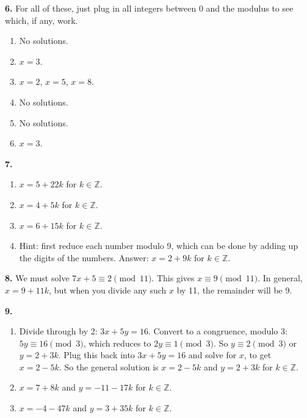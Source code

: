\documentclass[10pt,]{book}
\theoremstyle{plain}
\theoremstyle{definition}
\theoremstyle{definition}
\theoremstyle{definition}
\numberwithin{equation}{chapter}
\def\Z{\mathbb Z}
\begin{document}
\par\smallskip
\noindent\textbf{6.}\quad{}
For all of these, just plug in all integers between 0 and the modulus to see which, if any, work.
%
\leavevmode%
\begin{enumerate}[label=(\alph*)]
\item\hypertarget{li-1423}{}
No solutions.
%
\item\hypertarget{li-1424}{}\(x = 3\).%
\item\hypertarget{li-1425}{}\(x = 2\), \(x = 5\), \(x = 8\).%
\item\hypertarget{li-1426}{}
No solutions.
%
\item\hypertarget{li-1427}{}
No solutions.
%
\item\hypertarget{li-1428}{}\(x = 3\).%
\end{enumerate}
\par\smallskip
\noindent\textbf{7.}\quad{}\leavevmode%
\begin{enumerate}[label=(\alph*)]
\item\hypertarget{li-1433}{}\(x = 5+22k\) for \(k \in \Z\).%
\item\hypertarget{li-1434}{}\(x = 4 + 5k\) for \(k \in \Z\).%
\item\hypertarget{li-1435}{}\(x = 6 + 15k\) for \(k \in \Z\).%
\item\hypertarget{li-1436}{}
Hint: first reduce each number modulo 9, which can be done by adding up the digits of the numbers.  Answer: \(x = 2 + 9k\) for \(k \in \Z\).
%
\end{enumerate}
\par\smallskip
\noindent\textbf{8.}\quad{}
We must solve \(7x + 5 \equiv 2 \pmod{11}\). This gives \(x \equiv 9 \pmod{11}\). In general, \(x = 9 + 11k\), but when you divide any such \(x\) by 11, the remainder will be 9.
%
\par\smallskip
\noindent\textbf{9.}\quad{}\leavevmode%
\begin{enumerate}[label=(\alph*)]
\item\hypertarget{li-1440}{}
Divide through by 2: \(3x + 5y = 16\).  Convert to a congruence, modulo 3: \(5y \equiv 16 \pmod 3\), which reduces to \(2y \equiv 1 \pmod 3\).  So \(y \equiv 2 \pmod 3\) or \(y = 2 + 3k\).  Plug this back into \(3x + 5y = 16\) and solve for \(x\), to get \(x = 2-5k\).  So the general solution is \(x = 2-5k\) and \(y = 2+3k\) for \(k \in \Z\).
%
\item\hypertarget{li-1441}{}\(x = 7+8k\) and \(y = -11 - 17k\) for \(k \in \Z\).%
\item\hypertarget{li-1442}{}\(x = -4-47k\) and \(y = 3 + 35k\) for \(k \in \Z\).%
\end{enumerate}
\end{document}
